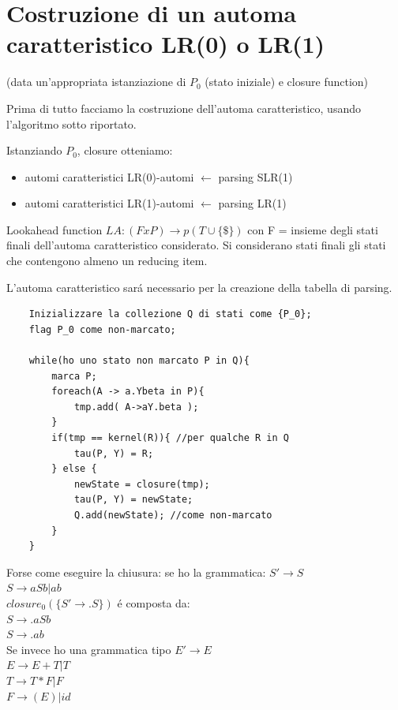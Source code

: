 \chapter{Costruzione di un automa caratteristico LR(0) o LR(1)}
(data un'appropriata istanziazione di $P_0$ (stato iniziale) e closure function)

Prima di tutto facciamo la costruzione dell'automa caratteristico, usando l'algoritmo sotto riportato.

Istanziando $P_0$, closure otteniamo:
\begin{itemize}
	\item automi caratteristici LR(0)-automi $\leftarrow$ parsing SLR(1)\\
	\item automi caratteristici LR(1)-automi $\leftarrow$ parsing LR(1)\\
\end{itemize}
Lookahead function $LA:(FxP) \rightarrow p(T \cup \{ \$ \} )$
con F = insieme degli stati finali dell'automa caratteristico considerato. Si considerano stati finali gli stati che contengono almeno un reducing item.

L'automa caratteristico sar\'a necessario per la creazione della tabella di parsing.

\begin{lstlisting}
	Inizializzare la collezione Q di stati come {P_0};
	flag P_0 come non-marcato;

	while(ho uno stato non marcato P in Q){
		marca P;
		foreach(A -> a.Ybeta in P){
			tmp.add( A->aY.beta );
		}
		if(tmp == kernel(R)){ //per qualche R in Q
			tau(P, Y) = R;
		} else {
			newState = closure(tmp);
			tau(P, Y) = newState;
			Q.add(newState); //come non-marcato 
		}
	}
\end{lstlisting}

Forse come eseguire la chiusura:
se ho la grammatica:
$S' \rightarrow S$\\
$S \rightarrow aSb|ab$\\
$closure_0(\{ S' \rightarrow .S\})$ \'e composta da:\\
$S \rightarrow .aSb$\\
$S \rightarrow .ab$\\

Se invece ho una grammatica tipo 
$E' \rightarrow E$\\
$E \rightarrow E + T | T$\\
$T \rightarrow T * F | F$\\
$F \rightarrow (E) | id $\\


